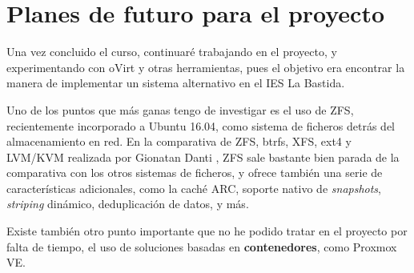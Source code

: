 \section{Planes de futuro para el proyecto}
\label{sec:futuro}

Una vez concluido el curso, continuaré trabajando en el proyecto, y experimentando con oVirt y otras herramientas, pues el objetivo era encontrar la manera de implementar un sistema alternativo en el IES La Bastida.

Uno de los puntos que más ganas tengo de investigar es el uso de ZFS, recientemente incorporado a Ubuntu 16.04, como sistema de ficheros detrás del almacenamiento en red. En la comparativa de ZFS, btrfs, XFS, ext4 y LVM/KVM realizada por Gionatan Danti \cite{danticomparison}, ZFS sale bastante bien parada de la comparativa con los otros sistemas de ficheros, y ofrece también una serie de características adicionales, como la caché ARC, soporte nativo de \emph{snapshots}, \emph{striping} dinámico, deduplicación de datos, y más.

 Existe también otro punto importante que no he podido tratar en el proyecto por falta de tiempo, el uso de soluciones basadas en \textbf{contenedores}, como Proxmox VE. 


